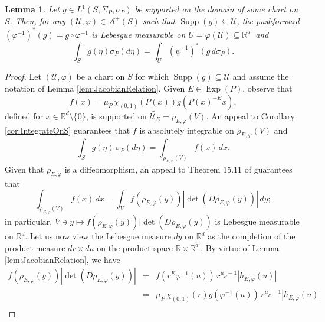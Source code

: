 \documentclass[11pt, letter]{book}
\newtheorem{lemma}[theorem]{Lemma}
\newcommand\Exp{\operatorname{Exp}}
\newcommand\supp{\operatorname{Supp}}
\renewcommand\det{\operatorname{det}}
\begin{document}
\begin{framed}
\begin{lemma}\label{lem:LocalIntegralFormula}
Let $g\in L^1(S,\Sigma_P,\sigma_P)$ be supported on the domain of some chart on $S$. Then, for any $(\mathcal{U},\varphi)\in\mathcal{A}^+(S)$ such that  $\supp(g)\subseteq\mathcal{U}$, the pushforward $(\varphi^{-1})^*(g)=g\circ\varphi^{-1}$ is Lebesgue measurable on $U=\varphi(\mathcal{U})\subseteq\mathbb{R}^{d'}$ and 
\begin{equation*}
\int_S g(\eta)\sigma_P(d\eta)=\int_{U}(\psi^{-1})^*(g\, d\sigma_P).
\end{equation*}
\end{lemma}
\end{framed}
\begin{proof}
Let $(\mathcal{U},\varphi)$ be a chart on $S$ for which $\supp(g)\subseteq \mathcal{U}$ and assume the notation of Lemma \ref{lem:JacobianRelation}. Given $E\in\Exp(P)$, observe that
\begin{equation*}
    f(x)=\mu_P\, \chi_{(0,1)}(P(x))g(P(x)^{-E}x),
\end{equation*}
defined for $x\in\mathbb{R}^d\setminus\{0\}$, is supported on $\widetilde{\mathcal{U}_E}=\rho_{E,\varphi}(V)$. An appeal to Corollary \ref{cor:IntegrateOnS} guarantees that $f$ is absolutely integrable on $\rho_{E,\varphi}(V)$ and
\begin{equation}\label{eq:LocalIntegralFormula1}
\int_S g(\eta)\,\sigma_P(d\eta)=\int_{\rho_{E,\varphi}(V)}f(x)\,dx.
\end{equation}
Given that $\rho_{E,\varphi}$ is a diffeomorphism, an appeal to Theorem 15.11 of \cite{apostol_mathematical_1974} guarantees that
\begin{equation}\label{eq:LocalIntegralFormula2}
\int_{\rho_{E,\varphi}(V)}f(x)\,dx=\int_V f(\rho_{E,\varphi}(y))|\det(D\rho_{E,\varphi}(y))|\,dy;
\end{equation}
in particular, $V\ni y\mapsto f(\rho_{E,\varphi}(y))|\det(D\rho_{E,\varphi}(y))$ is Lebesgue measurable on $\mathbb{R}^{d}$. Let us now view the Lebesgue measure $dy$ on $\mathbb{R}^d$ as the completion of the product measure $dr\times du$ on the product space $\mathbb{R}\times\mathbb{R}^{d'}$. By virtue of Lemma \ref{lem:JacobianRelation}, we have
\begin{eqnarray}\label{eq:LocalIntegralFormula3}\nonumber
    f(\rho_{E,\varphi}(y))|\det(D\rho_{E,\varphi}(y))|
    &=& f(r^E\varphi^{-1}(u))\,r^{\mu_{P}-1}|h_{E,\varphi}(u)|\\ \nonumber
    &=& \mu_P\,\chi_{(0,1)}(r)g(\varphi^{-1}(u))\, r^{\mu_P-1}|h_{E,\varphi}(u)|\\ 

\end{eqnarray}
\end{proof}
\end{document}
